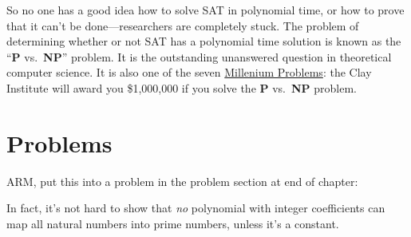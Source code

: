 So no one has a good idea how to solve SAT in polynomial time, or how
to prove that it can't be done---researchers are completely stuck.
The problem of determining whether or not SAT has a polynomial time
solution is known as the ``\textbf{P} vs.\ \textbf{NP}'' problem.  It
is the outstanding unanswered question in theoretical computer
science.  It is also one of the
seven \href{http://www.claymath.org/millennium/}{Millenium Problems}:
the Clay Institute will award you \$1,000,000 if you solve
the \textbf{P} vs.\ \textbf{NP} problem.

\section{Problems}

\begin{problems}
\classproblems
{}
\homeworkproblems
{}
\end{problems}

\begin{editingnotes}
ARM, put this into a problem in the problem section at end of chapter:

In fact, it's not hard to show that \emph{no} polynomial
with integer coefficients can map all natural numbers into prime
numbers, unless it's a constant.
\end{editingnotes}

\endinput
